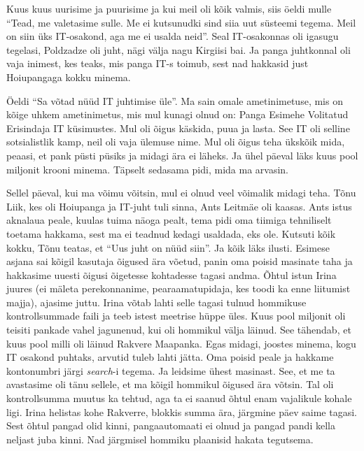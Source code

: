 Kuus kuus uurisime ja puurisime ja kui meil oli kõik valmis, siis öeldi mulle 
\enquote{Tead, me valetasime sulle. Me ei kutsunudki sind siia uut süsteemi 
tegema. Meil on siin üks IT-osakond, aga me ei usalda neid}. Seal IT-osakonnas 
oli igasugu tegelasi, Poldzadze oli juht, nägi välja nagu Kirgiisi bai. Ja 
panga juhtkonnal oli vaja inimest, kes teaks, mis panga IT-s toimub, sest nad 
hakkasid just Hoiupangaga kokku minema. 

Öeldi \enquote{Sa võtad nüüd IT juhtimise üle}. Ma sain omale ametinimetuse, 
mis on kõige uhkem ametinimetus, mis mul kunagi olnud on: Panga Esimehe 
Volitatud Erisindaja IT küsimustes. Mul oli õigus käskida, puua ja lasta. See 
IT oli selline sotsialistlik kamp, neil oli vaja ülemuse nime. Mul oli õigus 
teha ükskõik mida, peaasi, et pank püsti püsiks ja midagi ära ei läheks. Ja 
ühel päeval läks kuus pool miljonit krooni minema. Täpselt sedasama pidi, mida 
ma arvasin. 

Sellel päeval, kui ma võimu võitsin, mul ei olnud veel võimalik midagi teha. 
Tõnu Liik, kes oli Hoiupanga ja IT-juht tuli sinna, Ants 
Leitmäe oli kaasas. Ants istus aknalaua peale, kuulas 
tuima näoga pealt, tema pidi oma tiimiga tehniliselt toetama hakkama, sest ma 
ei teadnud kedagi usaldada, eks ole. Kutsuti kõik kokku, Tõnu teatas, et 
\enquote{Uus juht on nüüd siin}. Ja kõik läks ilusti. Esimese asjana sai kõigil 
kasutaja õigused ära võetud, panin oma poisid masinate taha ja hakkasime uuesti 
õigusi õigetesse kohtadesse tagasi andma. Õhtul istun Irina juures (ei mäleta 
perekonnanime, pearaamatupidaja, kes toodi ka enne liitumist majja), ajasime 
juttu.  Irina võtab lahti selle tagasi tulnud hommikuse kontrollsummade faili 
ja teeb istest meetrise hüppe üles. Kuus pool miljonit oli teisiti pankade 
vahel jagunenud, kui oli hommikul välja läinud. See tähendab, et kuus pool 
milli oli läinud Rakvere Maapanka. Egas midagi, 
joostes minema, kogu IT osakond puhtaks, arvutid tuleb lahti jätta. Oma poisid 
peale ja hakkame kontonumbri järgi \emph{search}-i tegema. Ja leidsime ühest 
masinast. See, et me ta avastasime oli tänu sellele, et ma kõigil hommikul 
õigused ära võtsin. Tal oli kontrollsumma muutus ka tehtud, aga ta ei saanud 
õhtul enam vajalikule kohale ligi. Irina helistas kohe Rakverre, blokkis summa 
ära, järgmine päev saime tagasi. Sest õhtul pangad olid kinni, pangaautomaati 
ei olnud ja pangad pandi kella neljast juba kinni. Nad järgmisel hommiku 
plaanisid hakata tegutsema.  

